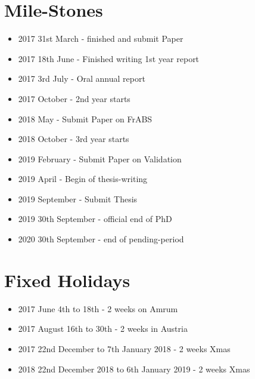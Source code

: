 \section{Mile-Stones}
\begin{itemize}
	\item 2017 31st March - finished and submit Paper 
	\item 2017 18th June - Finished writing 1st year report 
	\item 2017 3rd July - Oral annual report
	\item 2017 October - 2nd year starts
	\item 2018 May - Submit Paper on FrABS
	\item 2018 October - 3rd year starts
	\item 2019 February - Submit Paper on Validation
	\item 2019 April - Begin of thesis-writing
	\item 2019 September - Submit Thesis
	\item 2019 30th September - official end of PhD
	\item 2020 30th September - end of pending-period
\end{itemize}

\section{Fixed Holidays}
\begin{itemize}
	\item 2017 June 4th to 18th - 2 weeks on Amrum 
	\item 2017 August 16th to 30th - 2 weeks in Austria
	\item 2017 22nd December to 7th January 2018 - 2 weeks Xmas
	\item 2018 22nd December 2018 to 6th January 2019 - 2 weeks Xmas
\end{itemize}